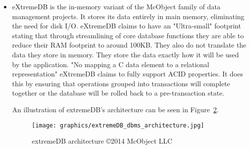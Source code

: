 \documentclass[letterpaper, 11pt]{article}
\begin{document}
\begin{itemize}
  dashDB uses a highly parallelized infrastructure optimized for columnar data
  exchange that is organized as such:
  \par\vspace{\baselineskip}
  A example of dasDB's query architecture can be seen in Figure~\ref{fig:dashdb_query}.
  \begin{figure}
 	\centering
 	\texttt{[image: graphics/dashDB\_query\_architecture.png]}
	\caption{Example of dashDB Query Architecture \copyright dashDB \cite{dashDB}}
 	\label{fig:dashdb_query} 
  \end{figure}
\par\vspace{\baselineskip}
\item eXtremeDB is the in-memory variant of the McObject family of data management projects.
  It stores its data entirely in main memory, eliminating the need for disk I/O.
  eXtremeDB claims to have an "Ultra-small" footprint stating that through
  streamlining of core database functions they are able to reduce their RAM footprint
  to around 100KB. They also do not translate the data they store in memory. They
  store the data exactly how it will be used by the application. "No mapping a C data
  element to a relational representation"\cite{extremeDB} eXtremeDB claims to fully
  support ACID properties. It does this by ensuring that operations grouped into
  transactions will complete together or the database will be rolled back to a
  pre-transaction state.\cite{extremeDB}
  \par\vspace{\baselineskip}
  An illustration of extremeDB's architecture can be seen in Figure~\ref{fig:extremedb_architecture}.
  \begin{figure}
	\centering
	\texttt{[image: graphics/extremeDB\_dbms\_architecture.jpg]}
	\caption{extremeDB architecture \copyright 2014 McObject LLC \cite{extremeDB}}
	\label{fig:extremedb_architecture}  
  \end{figure}
  \par\vspace{\baselineskip}


\end{itemize}
\end{document}
